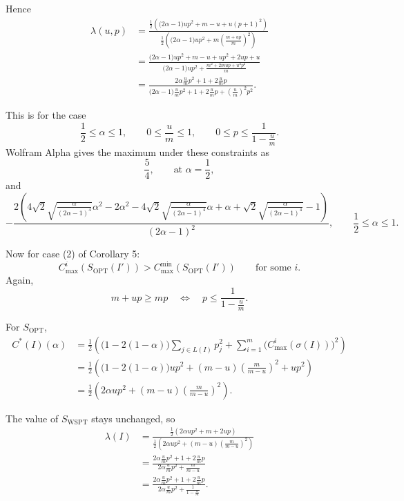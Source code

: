 \documentclass[11pt]{article}
\newcommand{\WSPT}{\mathrm{WSPT}}
\newcommand{\OPT}{\mathrm{OPT}}
\begin{document}
Hence
\begin{align*}
    \lambda(u,p)
    &=
    \frac{
        \frac12\left(
            \bigl(2\alpha-1\bigr)up^2
            + m-u + u(p+1)^2
        \right)
    }{
        \frac12\left(
            \bigl(2\alpha-1\bigr)up^2
            + m\left(\frac{m+up}{m}\right)^2
        \right)
    } \\
    &=
    \frac{
        \bigl(2\alpha-1\bigr)up^2
        + m-u + up^2 + 2up + u
    }{
        \bigl(2\alpha-1\bigr)up^2
        + \frac{m^2+2mup+u^2p^2}{m}
    } \\
    &=
    \frac{
        2\alpha\frac{u}{m}p^2 + 1 + 2\frac{u}{m}p
    }{
        \bigl(2\alpha-1\bigr)\frac{u}{m}p^2
        + 1 + 2\frac{u}{m}p
        + \left(\frac{u}{m}\right)^2p^2
    }.
\end{align*}

This is for the case
\[
    \frac12 \le \alpha \le 1,
    \qquad
    0 \le \frac{u}{m} \le 1,
    \qquad
    0 \le p \le \frac{1}{1-\frac{u}{m}}.
\]
Wolfram Alpha gives the maximum under these constraints as
\[
    \frac54,
    \qquad \text{at } \alpha = \frac12,
\]
and
\[
    -
    \frac{
        2\left(
            4\sqrt{2}\sqrt{\frac{\alpha}{(2\alpha-1)^4}}\alpha^2
            - 2\alpha^2
            - 4\sqrt{2}\sqrt{\frac{\alpha}{(2\alpha-1)^4}}\alpha
            + \alpha
            + \sqrt{2}\sqrt{\frac{\alpha}{(2\alpha-1)^4}}
            - 1
        \right)
    }{
        (2\alpha-1)^2
    },
    \qquad
    \frac12 \le \alpha \le 1.
\]

Now for case (2) of Corollary 5:
\[
    C_{\max}^i(S_{\OPT}(I')) > C_{\max}^{\min}(S_{\OPT}(I'))
    \qquad \text{for some } i.
\]
Again,
\[
    m + up \ge mp
    \quad\Longleftrightarrow\quad
    p \le \frac{1}{1-\frac{u}{m}}.
\]

For $S_{\OPT}$,
\begin{align*}
    C^*(I)(\alpha)
    &=
    \frac12 \left(
        \bigl(1 - 2(1-\alpha)\bigr)
        \sum_{j \in L(I)} p_j^2
        +
        \sum_{i=1}^m
        \bigl(C_{\max}^i(\sigma(I))\bigr)^2
    \right) \\
    &=
    \frac12 \left(
        \bigl(1 - 2(1-\alpha)\bigr)up^2
        +
        (m-u)\left(\frac{m}{m-u}\right)^2
        +
        up^2
    \right) \\
    &=
    \frac12 \left(
        2\alpha up^2
        +
        (m-u)\left(\frac{m}{m-u}\right)^2
    \right).
\end{align*}

The value of $S_{\WSPT}$ stays unchanged, so
\begin{align*}
    \lambda(I)
    &=
    \frac{
        \frac12\left(2\alpha up^2 + m + 2up\right)
    }{
        \frac12\left(2\alpha up^2 + (m-u)\left(\frac{m}{m-u}\right)^2\right)
    } \\
    &=
    \frac{
        2\alpha \frac{u}{m}p^2 + 1 + 2\frac{u}{m}p
    }{
        2\alpha \frac{u}{m}p^2 + \frac{m}{m-u}
    } \\
    &=
    \frac{
        2\alpha \frac{u}{m}p^2 + 1 + 2\frac{u}{m}p
    }{
        2\alpha \frac{u}{m}p^2 + \frac{1}{1-\frac{u}{m}}
    }.
\end{align*}
\end{document}
